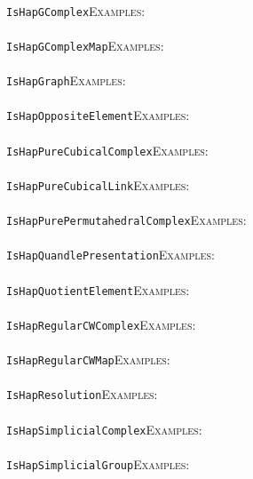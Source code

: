 \documentclass[a4paper,11pt]{report}
\begin{document}
{{ \\
 \texttt{IsHapGComplex}{\nobreakspace}{\nobreakspace}{\nobreakspace}{\nobreakspace}\textsc{Examples:} \\
 \\
 \texttt{IsHapGComplexMap}{\nobreakspace}{\nobreakspace}{\nobreakspace}{\nobreakspace}\textsc{Examples:} \\
 \\
 \texttt{IsHapGraph}{\nobreakspace}{\nobreakspace}{\nobreakspace}{\nobreakspace}\textsc{Examples:} \\
 \\
 \texttt{IsHapOppositeElement}{\nobreakspace}{\nobreakspace}{\nobreakspace}{\nobreakspace}\textsc{Examples:} \\
 \\
 \texttt{IsHapPureCubicalComplex}{\nobreakspace}{\nobreakspace}{\nobreakspace}{\nobreakspace}\textsc{Examples:} \\
 \\
 \texttt{IsHapPureCubicalLink}{\nobreakspace}{\nobreakspace}{\nobreakspace}{\nobreakspace}\textsc{Examples:} \\
 \\
 \texttt{IsHapPurePermutahedralComplex}{\nobreakspace}{\nobreakspace}{\nobreakspace}{\nobreakspace}\textsc{Examples:} \\
 \\
 \texttt{IsHapQuandlePresentation}{\nobreakspace}{\nobreakspace}{\nobreakspace}{\nobreakspace}\textsc{Examples:} \\
 \\
 \texttt{IsHapQuotientElement}{\nobreakspace}{\nobreakspace}{\nobreakspace}{\nobreakspace}\textsc{Examples:} \\
 \\
 \texttt{IsHapRegularCWComplex}{\nobreakspace}{\nobreakspace}{\nobreakspace}{\nobreakspace}\textsc{Examples:} \\
 \\
 \texttt{IsHapRegularCWMap}{\nobreakspace}{\nobreakspace}{\nobreakspace}{\nobreakspace}\textsc{Examples:} \\
 \\
 \texttt{IsHapResolution}{\nobreakspace}{\nobreakspace}{\nobreakspace}{\nobreakspace}\textsc{Examples:} \\
 \\
 \texttt{IsHapSimplicialComplex}{\nobreakspace}{\nobreakspace}{\nobreakspace}{\nobreakspace}\textsc{Examples:} \\
 \\
 \texttt{IsHapSimplicialGroup}{\nobreakspace}{\nobreakspace}{\nobreakspace}{\nobreakspace}\textsc{Examples:} \\
}}
\end{document}

